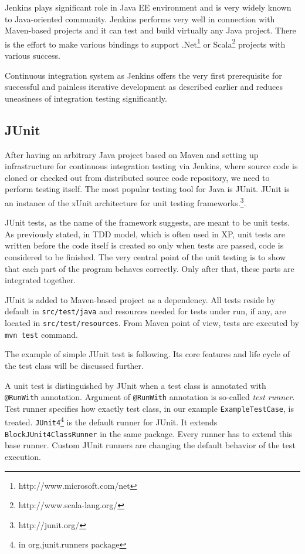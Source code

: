 \documentclass[12pt,final,oneside]{fithesis}
\begin{document}
Jenkins plays significant role in Java EE environment and is very widely known to Java-oriented community. Jenkins performs very well in connection with Maven-based projects and it can test and build virtually any Java project. There is the effort to make various bindings to support .Net\footnote{http://www.microsoft.com/net} or Scala\footnote{http://www.scala-lang.org/} projects with various success.

Continuous integration system as Jenkins offers the very first prerequisite for successful and painless iterative development as described earlier and reduces uneasiness of integration testing significantly.

		\subsection{JUnit}
		
After having an arbitrary Java project based on Maven and setting up infrastructure for continuous integration testing via Jenkins, where source code is cloned or checked out from distributed source code repository, we need to perform testing itself. The most popular testing tool for Java is JUnit. JUnit is an instance of the xUnit architecture for unit testing frameworks.\footnote{http://junit.org/}.

JUnit tests, as the name of the framework suggests, are meant to be unit tests. As previously stated, in TDD model, which is often used in XP, unit tests are written before the code itself is created so only when tests are passed, code is considered to be finished. The very central point of the unit testing is to show that each part of the program behaves correctly. Only after that, these parts are integrated together.

JUnit is added to Maven-based project as a dependency. All tests reside by default in \texttt{src/test/java} and resources needed for tests under run, if any, are located in \texttt{src/test/resources}. From Maven point of view, tests are executed by \texttt{mvn test} command.

The example of simple JUnit test is following. Its core features and life cycle of the test class will be discussed further.



\newpage

A unit test is distinguished by JUnit when a test class is annotated with \texttt{@RunWith} annotation. Argument of \texttt{@RunWith} annotation is so-called \textit{test runner}. Test runner specifies how exactly test class, in our example \texttt{ExampleTestCase}, is treated. \texttt{JUnit4}\footnote{in org.junit.runners package} is the default runner for JUnit. It extends \texttt{BlockJUnit4ClassRunner} in the same package. Every runner has to extend this base runner. Custom JUnit runners are changing the default behavior of the test execution.
\end{document}
